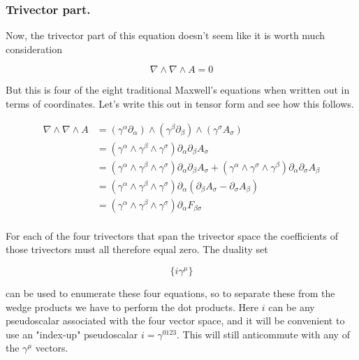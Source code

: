 \documentclass{article}
\newcommand{\grad}[0]{\nabla}
\begin{document}
\subsubsection{ Trivector part. }

Now, the trivector part of this equation doesn't seem like it is worth much consideration

\begin{equation}
\grad \wedge \grad \wedge A = 0
\end{equation}

But this is four of the eight traditional Maxwell's equations when written out in terms of coordinates.  Let's write this out in tensor form
and see how this follows.

\begin{align*}
\grad \wedge \grad \wedge A 
&= (\gamma^{\alpha} \partial_{\alpha}) \wedge (\gamma^{\beta} \partial_{\beta}) \wedge (\gamma^{\sigma} A_{\sigma}) \\
&= (\gamma^{\alpha} \wedge \gamma^{\beta} \wedge \gamma^{\sigma}) \partial_{\alpha} \partial_{\beta} A_{\sigma} \\
&= 
(\gamma^{\alpha} \wedge \gamma^{\beta} \wedge \gamma^{\sigma}) \partial_{\alpha} \partial_{\beta} A_{\sigma} 
+
(\gamma^{\alpha} \wedge \gamma^{\sigma} \wedge \gamma^{\beta}) \partial_{\alpha} \partial_{\sigma} A_{\beta} 
\\
&= (\gamma^{\alpha} \wedge \gamma^{\beta} \wedge \gamma^{\sigma}) \partial_{\alpha} (\partial_{\beta} A_{\sigma} - \partial_{\sigma} A_{\beta}) \\
&= (\gamma^{\alpha} \wedge \gamma^{\beta} \wedge \gamma^{\sigma}) \partial_{\alpha} F_{\beta\sigma} \\
\end{align*}

For each of the four trivectors that span the trivector space the coefficients of those trivectors must all therefore equal zero.  The duality set

\begin{equation*}
\{ i \gamma^{\mu} \}
\end{equation*}

can be used to enumerate these four equations, so to separate these from the wedge products we have to perform the dot products.  Here $i$ can be any pseudoscalar
associated with the four vector space, and it will be convenient to use an "index-up" pseudoscalar $i=\gamma^{0123}$.   This will still anticommute with any of the $\gamma^{\mu}$ vectors.
\end{document}
